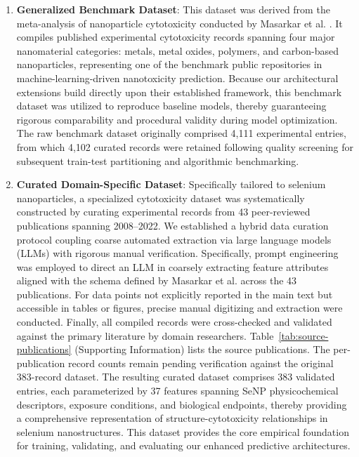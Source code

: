 \documentclass[letterpaper]{article}
\begin{document}
\begin{enumerate}
  \item \textbf{Generalized Benchmark Dataset}: This dataset was derived from the meta-analysis of nanoparticle cytotoxicity conducted by Masarkar et al. \cite{masarkar2024}. It compiles published experimental cytotoxicity records spanning four major nanomaterial categories: metals, metal oxides, polymers, and carbon-based nanoparticles, representing one of the benchmark public repositories in machine-learning-driven nanotoxicity prediction. Because our architectural extensions build directly upon their established framework, this benchmark dataset was utilized to reproduce baseline models, thereby guaranteeing rigorous comparability and procedural validity during model optimization. The raw benchmark dataset originally comprised 4,111 experimental entries, from which 4,102 curated records were retained following quality screening for subsequent train-test partitioning and algorithmic benchmarking.

  \item \textbf{Curated Domain-Specific Dataset}: Specifically tailored to selenium nanoparticles, a specialized cytotoxicity dataset was systematically constructed by curating experimental records from 43 peer-reviewed publications spanning 2008–2022. We established a hybrid data curation protocol coupling coarse automated extraction via large language models (LLMs) with rigorous manual verification. Specifically, prompt engineering was employed to direct an LLM in coarsely extracting feature attributes aligned with the schema defined by Masarkar et al. \cite{masarkar2024} across the 43 publications. For data points not explicitly reported in the main text but accessible in tables or figures, precise manual digitizing and extraction were conducted. Finally, all compiled records were cross-checked and validated against the primary literature by domain researchers. Table~\ref{tab:source-publications} (Supporting Information) lists the source publications. The per-publication record counts remain pending verification against the original 383-record dataset. The resulting curated dataset comprises 383 validated entries, each parameterized by 37 features spanning SeNP physicochemical descriptors, exposure conditions, and biological endpoints, thereby providing a comprehensive representation of structure-cytotoxicity relationships in selenium nanostructures. This dataset provides the core empirical foundation for training, validating, and evaluating our enhanced predictive architectures.
\end{enumerate}
\end{document}
